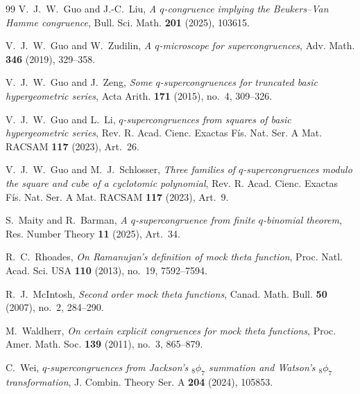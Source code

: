 \documentclass[reqno]{amsart}
\theoremstyle{definition}
\theoremstyle{plain}
\theoremstyle{remark}
\numberwithin{equation}{section}
\begin{document}
\begin{thebibliography}{99}
V.~J.~W.~Guo and J.-C.~Liu,
\emph{A $q$-congruence implying the Beukers--Van Hamme congruence},
Bull. Sci. Math. \textbf{201} (2025), 103615.

V.~J.~W.~Guo and W.~Zudilin,
\emph{A $q$-microscope for supercongruences},
Adv. Math. \textbf{346} (2019), 329--358.

V.~J.~W.~Guo and J.~Zeng,
\emph{Some $q$-supercongruences for truncated basic hypergeometric series},
Acta Arith. \textbf{171} (2015), no.~4, 309--326.

V.~J.~W.~Guo and L.~Li,
\emph{$q$-supercongruences from squares of basic hypergeometric series},
Rev. R. Acad. Cienc. Exactas F\'is. Nat. Ser. A Mat. RACSAM \textbf{117} (2023), Art.~26.

V.~J.~W.~Guo and M.~J.~Schlosser,
\emph{Three families of $q$-supercongruences modulo the square and cube of a cyclotomic polynomial},
Rev. R. Acad. Cienc. Exactas F\'is. Nat. Ser. A Mat. RACSAM \textbf{117} (2023), Art.~9.

S.~Maity and R.~Barman,
\emph{A $q$-supercongruence from finite $q$-binomial theorem},
Res. Number Theory \textbf{11} (2025), Art.~34.


R.~C.~Rhoades,
\emph{On Ramanujan's definition of mock theta function},
Proc. Natl. Acad. Sci. USA \textbf{110} (2013), no.~19, 7592--7594.

R.~J.~McIntosh,
\emph{Second order mock theta functions},
Canad. Math. Bull. \textbf{50} (2007), no.~2, 284--290.


M.~Waldherr,
\emph{On certain explicit congruences for mock theta functions},
Proc. Amer. Math. Soc. \textbf{139} (2011), no.~3, 865--879.

C.~Wei,
\emph{$q$-supercongruences from Jackson's ${}_8\phi_7$ summation and Watson's ${}_8\phi_7$ transformation},
J. Combin. Theory Ser. A \textbf{204} (2024), 105853.

\end{thebibliography}
\end{document}
